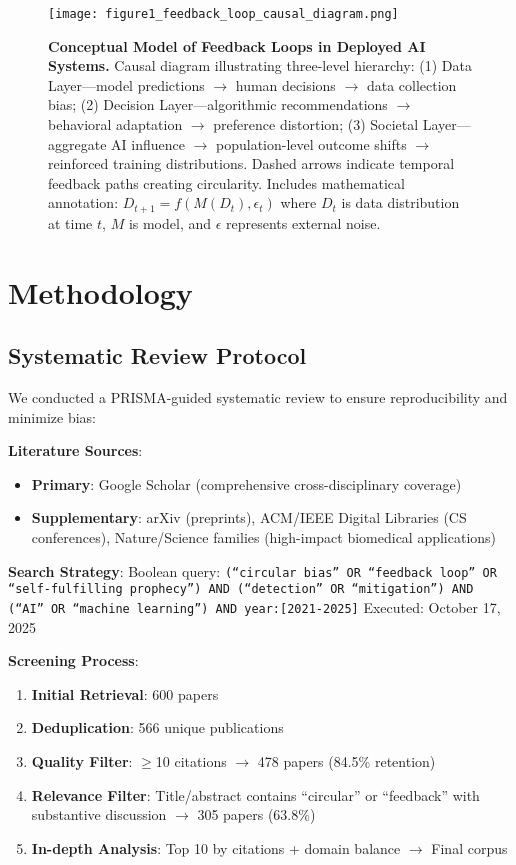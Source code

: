 \documentclass[11pt,a4paper]{article}
\begin{document}
\begin{figure}[htbp]
    \centering
    \texttt{[image: figure1\_feedback\_loop\_causal\_diagram.png]}
    \caption{\textbf{Conceptual Model of Feedback Loops in Deployed AI Systems.} Causal diagram illustrating three-level hierarchy: (1) Data Layer—model predictions $\rightarrow$ human decisions $\rightarrow$ data collection bias; (2) Decision Layer—algorithmic recommendations $\rightarrow$ behavioral adaptation $\rightarrow$ preference distortion; (3) Societal Layer—aggregate AI influence $\rightarrow$ population-level outcome shifts $\rightarrow$ reinforced training distributions. Dashed arrows indicate temporal feedback paths creating circularity. Includes mathematical annotation: $D_{t+1} = f(M(D_t), \epsilon_t)$ where $D_t$ is data distribution at time $t$, $M$ is model, and $\epsilon$ represents external noise.}
    \label{fig:feedback_loop}
\end{figure}

\section{Methodology}

\subsection{Systematic Review Protocol}

We conducted a PRISMA-guided systematic review to ensure reproducibility and minimize bias:

\textbf{Literature Sources}:  
\begin{itemize}
    \item \textbf{Primary}: Google Scholar (comprehensive cross-disciplinary coverage)  
    \item \textbf{Supplementary}: arXiv (preprints), ACM/IEEE Digital Libraries (CS conferences), Nature/Science families (high-impact biomedical applications)
\end{itemize}

\textbf{Search Strategy}:  
Boolean query: \texttt{(``circular bias'' OR ``feedback loop'' OR ``self-fulfilling prophecy'') AND (``detection'' OR ``mitigation'') AND (``AI'' OR ``machine learning'') AND year:[2021-2025]}  
Executed: October 17, 2025

\textbf{Screening Process}:  
\begin{enumerate}
    \item \textbf{Initial Retrieval}: 600 papers  
    \item \textbf{Deduplication}: 566 unique publications  
    \item \textbf{Quality Filter}: $\geq$10 citations $\rightarrow$ 478 papers (84.5\% retention)  
    \item \textbf{Relevance Filter}: Title/abstract contains ``circular'' or ``feedback'' with substantive discussion $\rightarrow$ 305 papers (63.8\%)  
    \item \textbf{In-depth Analysis}: Top 10 by citations + domain balance $\rightarrow$ Final corpus
\end{enumerate}
\end{document}
